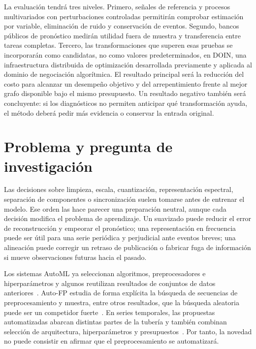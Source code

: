 \documentclass[11pt,letterpaper]{article}
\begin{document}
La evaluación tendrá tres niveles.
Primero, señales de referencia y procesos multivariados con perturbaciones controladas permitirán comprobar estimación por variable, eliminación de ruido y conservación de eventos.
Segundo, bancos públicos de pronóstico medirán utilidad fuera de muestra y transferencia entre tareas completas.
Tercero, las transformaciones que superen esas pruebas se incorporarán como candidatas, no como valores predeterminados, en DOIN, una infraestructura distribuida de optimización desarrollada previamente y aplicada al dominio de negociación algorítmica.
El resultado principal será la reducción del costo para alcanzar un desempeño objetivo y del arrepentimiento frente al mejor grafo disponible bajo el mismo presupuesto.
Un resultado negativo también será concluyente: si los diagnósticos no permiten anticipar qué transformación ayuda, el método deberá pedir más evidencia o conservar la entrada original.

\section{Problema y pregunta de investigación}

Las decisiones sobre limpieza, escala, cuantización, representación espectral, separación de componentes o sincronización suelen tomarse antes de entrenar el modelo.
Ese orden las hace parecer una preparación neutral, aunque cada decisión modifica el problema de aprendizaje.
Un suavizado puede reducir el error de reconstrucción y empeorar el pronóstico; una representación en frecuencia puede ser útil para una serie periódica y perjudicial ante eventos breves; una alineación puede corregir un retraso de publicación o fabricar fuga de información si mueve observaciones futuras hacia el pasado.

Los sistemas AutoML ya seleccionan algoritmos, preprocesadores e hiperparámetros y algunos reutilizan resultados de conjuntos de datos anteriores~\cite{feurer2015autosklearn,fusi2018pmf,yang2020tensoroboe}.
Auto-FP estudia de forma explícita la búsqueda de secuencias de preprocesamiento y muestra, entre otros resultados, que la búsqueda aleatoria puede ser un competidor fuerte~\cite{qi2024autofp}.
En series temporales, las propuestas automatizadas abarcan distintas partes de la tubería y también combinan selección de arquitectura, hiperparámetros y presupuestos~\cite{meisenbacher2022review,deng2022autodl,zoller2023autosktime}.
Por tanto, la novedad no puede consistir en afirmar que el preprocesamiento se automatizará.
\end{document}
